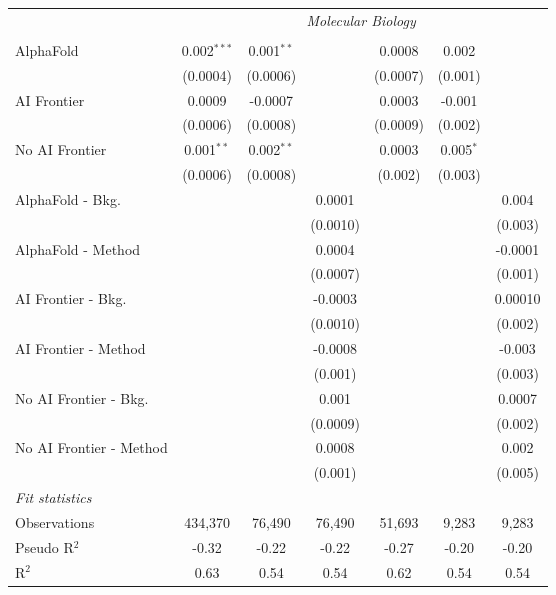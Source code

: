 \begin{tabular}{lcccccc}
 & \multicolumn{6}{c}{\textit{Molecular Biology}} \\ \\
   AlphaFold               & 0.002$^{***}$ & 0.001$^{**}$ &          & 0.0008   & 0.002       &   \\   
                           & (0.0004)      & (0.0006)     &          & (0.0007) & (0.001)     &   \\   
   AI Frontier             & 0.0009        & -0.0007      &          & 0.0003   & -0.001      &   \\   
                           & (0.0006)      & (0.0008)     &          & (0.0009) & (0.002)     &   \\   
   No AI Frontier          & 0.001$^{**}$  & 0.002$^{**}$ &          & 0.0003   & 0.005$^{*}$ &   \\   
                           & (0.0006)      & (0.0008)     &          & (0.002)  & (0.003)     &   \\   
   AlphaFold - Bkg.        &               &              & 0.0001   &          &             & 0.004\\   
                           &               &              & (0.0010) &          &             & (0.003)\\   
   AlphaFold - Method      &               &              & 0.0004   &          &             & -0.0001\\   
                           &               &              & (0.0007) &          &             & (0.001)\\   
   AI Frontier - Bkg.      &               &              & -0.0003  &          &             & 0.00010\\   
                           &               &              & (0.0010) &          &             & (0.002)\\   
   AI Frontier - Method    &               &              & -0.0008  &          &             & -0.003\\   
                           &               &              & (0.001)  &          &             & (0.003)\\   
   No AI Frontier - Bkg.   &               &              & 0.001    &          &             & 0.0007\\   
                           &               &              & (0.0009) &          &             & (0.002)\\   
   No AI Frontier - Method &               &              & 0.0008   &          &             & 0.002\\   
                           &               &              & (0.001)  &          &             & (0.005)\\   
   \midrule
   \emph{Fit statistics}\\
   Observations            & 434,370       & 76,490       & 76,490   & 51,693   & 9,283       & 9,283\\  
   Pseudo R$^2$            & -0.32         & -0.22        & -0.22    & -0.27    & -0.20       & -0.20\\  
   R$^2$                   & 0.63          & 0.54         & 0.54     & 0.62     & 0.54        & 0.54\\  
   

\end{tabular}
